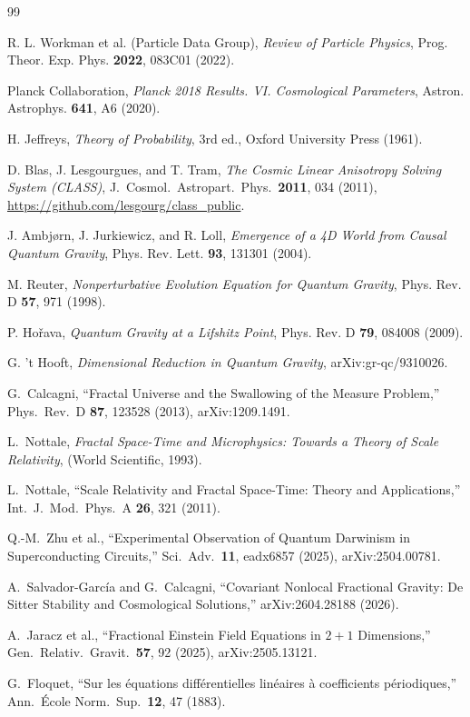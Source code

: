 \documentclass[12pt,a4paper,twocolumn]{article}
\begin{document}
\begin{thebibliography}{99}

R. L. Workman et al. (Particle Data Group), \textit{Review of Particle Physics}, Prog. Theor. Exp. Phys. \textbf{2022}, 083C01 (2022).

Planck Collaboration, \textit{Planck 2018 Results. VI. Cosmological Parameters}, Astron. Astrophys. \textbf{641}, A6 (2020).

H. Jeffreys, \textit{Theory of Probability}, 3rd ed., Oxford University Press (1961).

D. Blas, J. Lesgourgues, and T. Tram, \textit{The Cosmic Linear Anisotropy Solving System (CLASS)}, J.~Cosmol.~Astropart.~Phys.~\textbf{2011}, 034 (2011), \url{https://github.com/lesgourg/class_public}.

J. Ambj{\o}rn, J. Jurkiewicz, and R. Loll, \textit{Emergence of a 4D World from Causal Quantum Gravity}, Phys. Rev. Lett. \textbf{93}, 131301 (2004).

M. Reuter, \textit{Nonperturbative Evolution Equation for Quantum Gravity}, Phys. Rev. D \textbf{57}, 971 (1998).

P. Ho\v{r}ava, \textit{Quantum Gravity at a Lifshitz Point}, Phys. Rev. D \textbf{79}, 084008 (2009).

G. 't Hooft, \textit{Dimensional Reduction in Quantum Gravity}, arXiv:gr-qc/9310026.

G.~Calcagni,
``Fractal Universe and the Swallowing of the Measure Problem,''
Phys.\ Rev.\ D \textbf{87}, 123528 (2013), arXiv:1209.1491.

L.~Nottale,
\textit{Fractal Space-Time and Microphysics: Towards a Theory of Scale Relativity},
(World Scientific, 1993).

L.~Nottale,
``Scale Relativity and Fractal Space-Time: Theory and Applications,''
Int.\ J.\ Mod.\ Phys.\ A \textbf{26}, 321 (2011).

Q.-M.~Zhu et al.,
``Experimental Observation of Quantum Darwinism in Superconducting Circuits,''
Sci.\ Adv.\ \textbf{11}, eadx6857 (2025), arXiv:2504.00781.

A.~Salvador-Garc\'ia and G.~Calcagni,
``Covariant Nonlocal Fractional Gravity: De Sitter Stability and Cosmological Solutions,''
arXiv:2604.28188 (2026).

A.~Jaracz et al.,
``Fractional Einstein Field Equations in $2{+}1$ Dimensions,''
Gen.\ Relativ.\ Gravit.\ \textbf{57}, 92 (2025), arXiv:2505.13121.

G.~Floquet,
``Sur les \'equations diff\'erentielles lin\'eaires \`a coefficients p\'eriodiques,''
Ann.\ \'Ecole Norm.\ Sup.\ \textbf{12}, 47 (1883).

\end{thebibliography}
\end{document}
